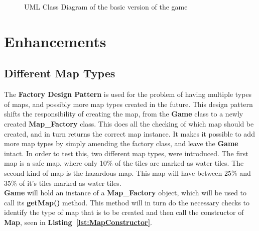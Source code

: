 \documentclass{article}
\begin{document}
\begin{figure}[ht]
    \caption{UML Class Diagram of the basic version of the game}
    \label{fig:classes}
\end{figure}

\newpage

\section{Enhancements}
\subsection{Different Map Types}

The \textbf{Factory Design Pattern} is used for the problem of having multiple types of maps,
and possibly more map types created in the future. This design pattern shifts the responsibility
of creating the map, from the \textbf{Game} class to a newly created \textbf{Map\_Factory} class. 
This does all the checking of which map should be created, and in turn returns the correct map
instance. It makes it possible to add more map types by simply amending the factory class, and 
leave the \textbf{Game} intact. In order to test this, two different map types, were introduced. The first map is a safe map, where only 10$\%$ of the tiles are marked as water tiles. The second kind of map is the hazardous map. This map will have between 25$\%$ and 35$\%$ of it's tiles marked as water tiles.\\

\noindent
\textbf{Game} will hold an instance of a \textbf{Map\_Factory} object, which will be used to call
its \textbf{getMap()} method. This method will in turn do the necessary checks to identify the 
type of map that is to be created and then call the constructor of \textbf{Map}, seen in 
\textbf{Listing~\ref{lst:MapConstructor}}.
\end{document}

